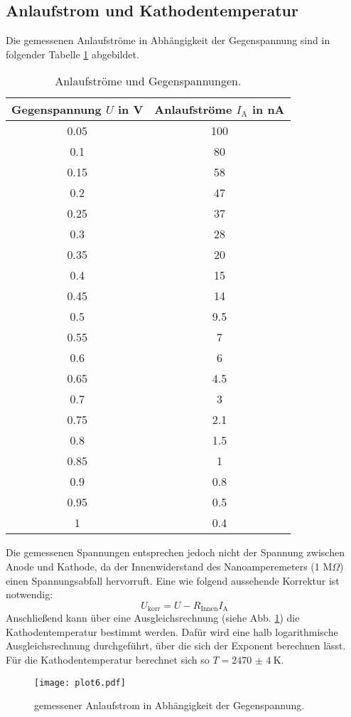 \subsection{Anlaufstrom und Kathodentemperatur}
\label{sec:anlauf}

Die gemessenen Anlaufströme in Abhängigkeit der Gegenspannung sind in folgender Tabelle \ref{tab:c} abgebildet.
\begin{table}
\centering
\caption{Anlaufströme und Gegenspannungen.}
\label{tab:c}
\begin{tabular}{c c}
\toprule
Gegenspannung $U$ in V & Anlaufströme $I_\text{A}$ in nA \\
\midrule
0.05 & 100 \\
0.1  & 80  \\
0.15 & 58  \\
0.2  & 47  \\
0.25 & 37  \\
0.3  & 28  \\
0.35 & 20  \\
0.4  & 15  \\
0.45 & 14  \\
0.5  & 9.5 \\
0.55 & 7   \\
0.6  & 6   \\
0.65 & 4.5 \\
0.7  & 3   \\
0.75 & 2.1 \\
0.8  & 1.5 \\
0.85 & 1   \\
0.9  & 0.8 \\
0.95 & 0.5 \\
1    & 0.4 \\
\bottomrule
\end{tabular}
\end{table}
Die gemessenen Spannungen entsprechen jedoch nicht der Spannung zwischen Anode und Kathode, da der Innenwiderstand des Nanoamperemeters (1 M$\Omega$) einen Spannungsabfall hervorruft.
Eine wie folgend aussehende Korrektur ist notwendig:
\begin{equation*}
  U_\text{korr} = U - R_\text{Innen} I_\text{A}
\end{equation*}
Anschließend kann über eine Ausgleichsrechnung (siehe Abb. \ref{fig:plot6}) die Kathodentemperatur bestimmt werden.
Dafür wird eine halb logarithmische Ausgleichsrechnung durchgeführt, über die sich der Exponent berechnen lässt.
Für die Kathodentemperatur berechnet sich so $T = \SI{2470(4)}{\kelvin}$.
\begin{figure}
  \centering
  \texttt{[image: plot6.pdf]}
  \caption{gemessener Anlaufstrom in Abhängigkeit der Gegenspannung.}
  \label{fig:plot6}
\end{figure}


